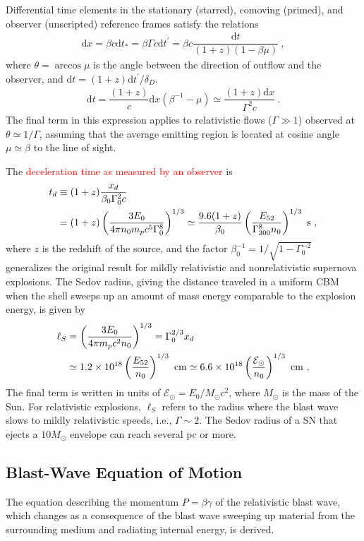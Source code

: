 \documentclass[12pt,a4paper]{article}
\newcommand{\dif}{\mathrm{d}}
\begin{document}
Differential time elements in the stationary (starred), comoving (primed), and observer (unscripted) reference frames satisfy the relations
\begin{align}
\dif x = \beta c \dif t_{\ast} = \beta \Gamma c \dif t^\prime = \beta c \dfrac{\dif t}{(1+z)(1-\beta \mu)} ~,
\end{align}
where $\theta = \arccos \mu$ is the angle between the direction of outflow and the observer, and $\dif t = (1+z)\dif t^\prime/\delta_D$. 
\begin{align}
\dif t = \dfrac{(1+z)}{c} \dif x (\beta^{-1} -\mu) \simeq \dfrac{(1+z) \dif x}{\Gamma^2 c} ~.
\end{align}
The final term in this expression applies to relativistic flows ($\Gamma \gg 1$) observed at $\theta \simeq 1/\Gamma$, assuming that the average emitting region is located at cosine angle $\mu \simeq \beta$ to the line of sight.

The \textcolor{red}{deceleration time as measured by an observer} is
\begin{align}
\nonumber t_d &\equiv (1+z) \dfrac{x_d}{\beta_0 \Gamma_0^2 c} \\ 
&= (1+z) \left(\dfrac{3E_0}{4\pi n_0 m_p c^5 \Gamma_0^8} \right)^{1/3} \simeq \dfrac{9.6(1+z)}{\beta_0} \left(\dfrac{E_{52}}{\Gamma_{300}^8 n_0} \right)^{1/3}  ~\rm s ~,
\end{align}
where $z$ is the redshift of the source, and the factor $\beta_0^{-1} = 1/\sqrt{1 -\Gamma_0^{-2}}$ generalizes the original result for mildly relativistic and nonrelativistic supernova explosions. The Sedov radius, giving the distance traveled in a uniform CBM when the shell sweeps up an amount of mass energy comparable to the explosion energy, is given by
\begin{align}
\ell_S &= \left(\dfrac{3E_0}{4\pi m_p c^2 n_0} \right)^{1/3} = \Gamma_0^{2/3} x_d \\
&\simeq 1.2 \times 10^{18} \left(\dfrac{E_{52}}{n_0} \right)^{1/3} ~{\rm cm} \simeq 6.6 \times 10^{18} \left(\dfrac{\mathcal E_\odot}{n_0} \right)^{1/3} ~\rm cm ~,
\end{align}
The final term is written in units of $\mathcal E_\odot = E_0/M_\odot c^2$, where $M_\odot$ is the mass of the Sun. For relativistic explosions, $\ell_S$ refers to the radius where the blast wave slows to mildly relativistic speeds, i.e., $\Gamma \sim 2$. The Sedov radius of a SN that ejects a $10 M_\odot$ envelope can reach several pc or more.


\subsection{Blast-Wave Equation of Motion}
The equation describing the momentum $P = \beta \gamma$ of the relativistic blast wave, which changes as a consequence of the blast wave sweeping up material from the surrounding medium and radiating internal energy, is derived.
\end{document}
